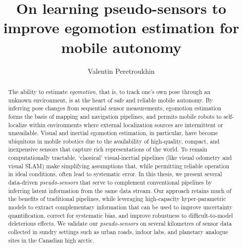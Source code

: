 \documentclass[oneandahalfspaced,twoside,12pt]{ut-thesis}
\author{Valentin Peretroukhin}
\title{On learning pseudo-sensors to improve egomotion estimation for mobile autonomy}
\begin{document}
\begin{preliminary}

\maketitle


\begin{abstract}
The ability to estimate \textit{egomotion}, that is, to track one's own pose through an unknown environment, is at the heart of safe and reliable mobile autonomy. By inferring pose changes from sequential sensor measurements, egomotion estimation forms the basis of mapping and navigation pipelines, and permits mobile robots to self-localize within environments where external localization sources are intermittent or unavailable. 
Visual and inertial egomotion estimation, in particular, have become ubiquitous in mobile robotics due to the availability of high-quality, compact, and inexpensive sensors that capture rich representations of the world.
 To remain computationally tractable, `classical' visual-inertial pipelines (like visual odometry and visual SLAM) make simplifying assumptions that, while permitting reliable operation in ideal conditions, often lead to systematic error. In this thesis, we present several data-driven \textit{pseudo-sensors} that serve to complement conventional pipelines by inferring latent information from the same data stream. Our approach retains much of the benefits of traditional pipelines, while leveraging high-capacity hyper-parametric models to extract complementary information that can be used to improve uncertainty quantification, correct for systematic bias, and improve robustness to difficult-to-model deleterious effects.
We validate our \textit{pseudo-sensors} on several kilometres of sensor data collected in sundry settings such as urban roads, indoor labs, and planetary analogue sites in the Canadian high arctic.
\end{abstract}


\end{preliminary}
\end{document}
